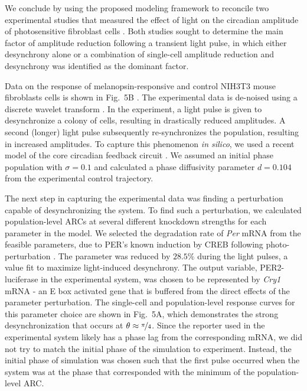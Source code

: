 \documentclass[11pt, letterpaper]{article}
\begin{document}
We conclude by using the proposed modeling framework to reconcile two experimental studies that measured the effect of light on the circadian amplitude of photosensitive fibroblast cells \cite{Ukai2007, Pulivarthy2007}.
Both studies sought to determine the main factor of amplitude reduction following a transient light pulse, in which either desynchrony alone \cite{Ukai2007} or a combination of single-cell amplitude reduction and desynchrony \cite{Pulivarthy2007} was identified as the dominant factor.

Data on the response of melanopsin-responsive and control NIH3T3 mouse fibroblasts cells is shown in Fig.~5B \cite{Ukai2007}.
The experimental data is de-noised using a discrete wavelet transform \cite{Leise2011}.
In the experiment, a light pulse is given to desynchronize a colony of cells, resulting in drastically reduced amplitudes.
A second (longer) light pulse subsequently re-synchronizes the population, resulting in increased amplitudes.
To capture this phenomenon {\itshape in silico}, we used a recent model of the core circadian feedback circuit \cite{Hirota2012}.
We assumed an initial phase population with $\sigma = 0.1$ and calculated a phase diffusivity parameter $d = 0.104$ from the experimental control trajectory.

The next step in capturing the experimental data was finding a perturbation capable of desynchronizing the system.
To find such a perturbation, we calculated population-level ARCs at several different knockdown strengths for each parameter in the model.
We selected the degradation rate of {\itshape Per} mRNA from the feasible parameters, due to PER's known induction by CREB following photo-perturbation \cite{Tischkau2003}.
The parameter was reduced by $28.5\%$ during the light pulses, a value fit to maximize light-induced desynchrony.
The output variable, PER2-luciferase in the experimental system, was chosen to be represented by {\itshape Cry1} mRNA - an E box activated gene that is buffered from the direct effects of the parameter perturbation.
The single-cell and population-level response curves for this parameter choice are shown in Fig.~5A, which demonstrates the strong desynchronization that occurs at $\theta\approx\nicefrac{\pi}{4}$.
Since the reporter used in the experimental system likely has a phase lag from the corresponding mRNA, we did not try to match the initial phase of the simulation to experiment.
Instead, the initial phase of simulation was chosen such that the first pulse occurred when the system was at the phase that corresponded with the minimum of the population-level ARC.
\end{document}
